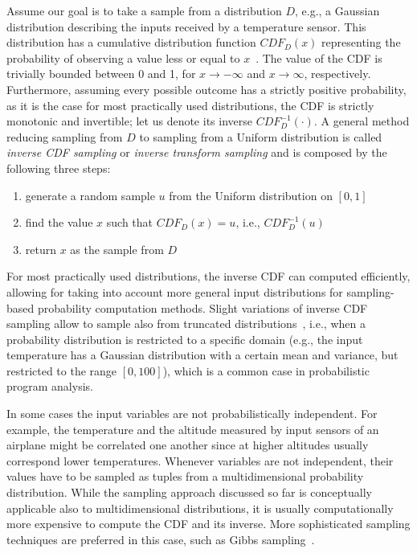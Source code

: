 Assume our goal is to take a sample from a distribution $D$, e.g., a Gaussian distribution describing the inputs received by a temperature sensor. This distribution has a cumulative distribution function $CDF_D(x)$ representing the probability of observing a value less or equal to $x$~\cite{pestman1998mathematical}. The value of the CDF is trivially bounded between 0 and 1, for $x\to -\infty$ and $x \to \infty$, respectively. Furthermore, assuming every possible outcome has a strictly positive probability, as it is the case for most practically used distributions, the CDF is strictly monotonic and invertible; let us denote its inverse $CDF_D^{-1}(\cdot)$. A general method reducing sampling from $D$ to sampling from a Uniform distribution is called \emph{inverse CDF sampling} or \emph{inverse transform sampling} and is composed by the following three steps:

\begin{enumerate}
	\item generate a random sample $u$ from the Uniform distribution on $[0,1]$
	\item find the value $x$ such that $CDF_D(x)=u$, i.e., $CDF_D^{-1}(u)$
	\item return $x$ as the sample from $D$
\end{enumerate}

For most practically used distributions, the inverse CDF can computed efficiently, allowing for taking into account more general input distributions for sampling-based probability computation methods. Slight variations of inverse CDF sampling allow to sample also from truncated distributions~\cite{cohen1991truncated}, i.e., when a probability distribution is restricted to a specific domain (e.g., the input temperature has a Gaussian distribution with a certain mean and variance, but restricted to the range $[0,100]$), which is a common case in probabilistic program analysis. 

In some cases the input variables are not probabilistically independent. For example, the temperature and the altitude measured by input sensors of an airplane might be correlated one another since at higher altitudes usually correspond lower temperatures. Whenever variables are not independent, their values have to be sampled as tuples from a multidimensional probability distribution. While the sampling approach discussed so far is conceptually applicable also to multidimensional distributions, it is usually computationally more expensive to compute the CDF and its inverse. More sophisticated sampling techniques are preferred in this case, such as Gibbs sampling~\cite{Robert2005MCBook}.

